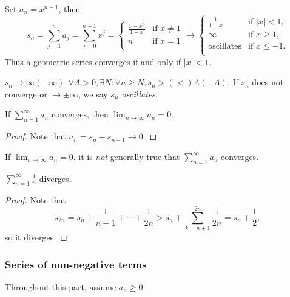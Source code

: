 \begin{example}
    Set $a_n=x^{n-1}$, then 
    \[
        s_n=\sum_{j=1}^{n}a_j=\sum_{j=0}^{n-1}x^j= \begin{cases}
        \frac{1-x^n}{1-x} &\text{if } x\neq 1\\
        n &\text{if }x=1\\
        \end{cases}
        \to \begin{cases}
            \frac{1}{1-x} &\text{if } |x|<1,\\
            \infty &\text{if } x\ge 1,\\
            \text{oscillates} &\text{if } x\le -1.\\
            \end{cases} 
    \]
    Thus a geometric series converges if and only if $|x|<1$.
\end{example}
\begin{note}
    $s_n\to \infty(-\infty): \forall A>0, \exists N: \forall n\ge N, s_n>(<)A(-A) $. If $s_n$ does not converge or $\to \pm \infty$, we say $s_n$ \textit{oscillates}.
\end{note}

\begin{lemma}\label{lma:1.7}
    If $ \sum_{n=1}^{\infty}a_n$ converges, then $ \lim_{n \to \infty} a_n=0$. 
\end{lemma}
\begin{proof}
    Note that $ a_n=s_{n}-s_{n-1}\to 0 $.
\end{proof}
\begin{remark}
    If $ \lim_{n \to \infty} a_n=0$, it is \textit{not} generally true that $ \sum_{n=1}^{\infty}a_n$ converges.
\end{remark}
\begin{sprop}
    $ \displaystyle \sum_{n=1}^{\infty}\frac{1}{n} $ diverges.
\end{sprop}
\begin{proof}
    Note that 
    \[
        s_{2n}=s_{n}+\frac{1}{n+1}+\cdots +\frac{1}{2n}>s_{n}+\sum_{k=n+1}^{2n}\frac{1}{2n}=s_n+\frac{1}{2},
    \]
    so it diverges.
\end{proof}

\subsubsection*{Series of non-negative terms}
Throughout this part, assume $a_n\ge 0$.

